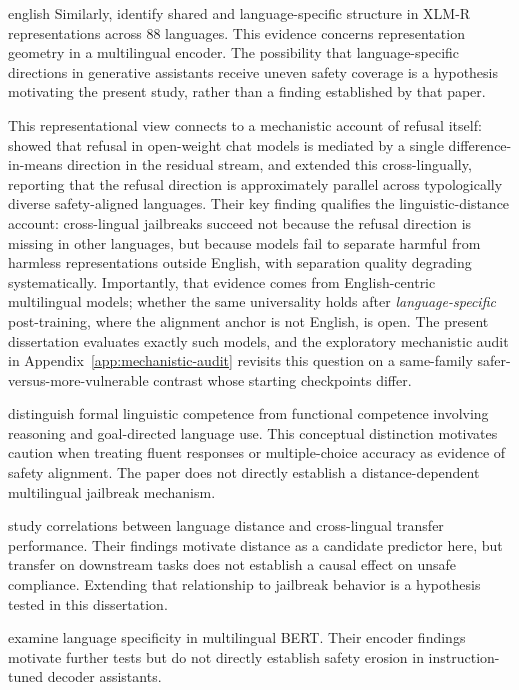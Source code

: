 \begin{otherlanguage*}{english}
Similarly, \textcite{changGeometryMultilingualLanguage2022} identify shared and language-specific structure in XLM-R representations across 88 languages. This evidence concerns representation geometry in a multilingual encoder. The possibility that language-specific directions in generative assistants receive uneven safety coverage is a hypothesis motivating the present study, rather than a finding established by that paper.

This representational view connects to a mechanistic account of refusal itself: \textcite{arditiRefusalLanguageModels2024} showed that refusal in open-weight chat models is mediated by a single difference-in-means direction in the residual stream, and \textcite{wangRefusalDirectionUniversal2025} extended this cross-lingually, reporting that the refusal direction is approximately parallel across typologically diverse safety-aligned languages. Their key finding qualifies the linguistic-distance account: cross-lingual jailbreaks succeed not because the refusal direction is missing in other languages, but because models fail to separate harmful from harmless representations outside English, with separation quality degrading systematically. Importantly, that evidence comes from English-centric multilingual models; whether the same universality holds after \emph{language-specific} post-training, where the alignment anchor is not English, is open. The present dissertation evaluates exactly such models, and the exploratory mechanistic audit in Appendix~\ref{app:mechanistic-audit} revisits this question on a same-family safer-versus-more-vulnerable contrast whose starting checkpoints differ.

\textcite{mahowaldDissociatingLanguageThought2024} distinguish formal linguistic competence from functional competence involving reasoning and goal-directed language use. This conceptual distinction motivates caution when treating fluent responses or multiple-choice accuracy as evidence of safety alignment. The paper does not directly establish a distance-dependent multilingual jailbreak mechanism.
	
\textcite{philippyIdentifyingCorrelationLanguage2023} study correlations between language distance and cross-lingual transfer performance. Their findings motivate distance as a candidate predictor here, but transfer on downstream tasks does not establish a causal effect on unsafe compliance. Extending that relationship to jailbreak behavior is a hypothesis tested in this dissertation.

\textcite{tantiLanguagespecificityMultilingualBERT2021} examine language specificity in multilingual BERT. Their encoder findings motivate further tests but do not directly establish safety erosion in instruction-tuned decoder assistants.


\end{otherlanguage*}

